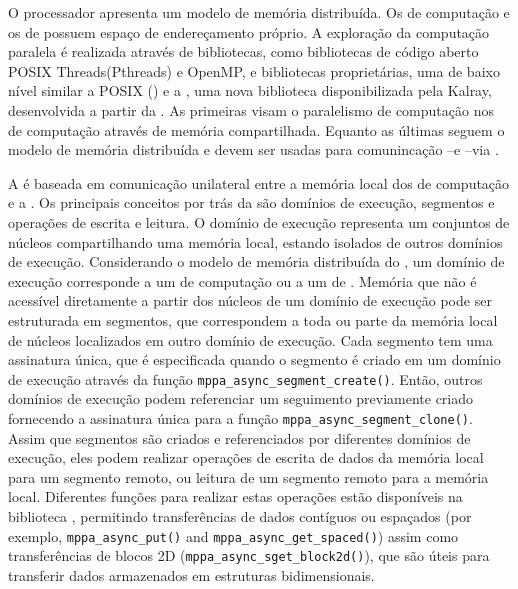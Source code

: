 O processador apresenta um modelo de memória distribuída. Os \clusters de computação e os \clusters de \io possuem espaço de endereçamento próprio. A exploração da computação paralela 
é realizada através de bibliotecas, como bibliotecas de código aberto POSIX Threads(Pthreads) e OpenMP, e bibliotecas proprietárias, uma de baixo nível similar a POSIX (\ipc) e a \async, uma nova biblioteca disponibilizada pela Kalray, desenvolvida a partir da \ipc. As primeiras visam o paralelismo de computação nos \clusters de computação através de memória compartilhada. Equanto as últimas seguem o modelo de memória distribuída e devem ser usadas para comunincação \cluster--\cluster e \cluster--\io via \noc.

A \async é baseada em comunicação unilateral entre a memória local dos \clusters de computação e a \lpddr. Os principais conceitos por trás da \async são domínios de execução, segmentos e operações de escrita e leitura. O domínio de execução representa um conjuntos de núcleos compartilhando uma memória local, estando isolados de outros domínios de execução. Considerando o modelo de memória distribuída do \mppa, um domínio de execução corresponde a um \cluster de computação ou a um \cluster de \io. Memória que não é acessível diretamente a partir dos núcleos de um domínio de execução pode ser estruturada em segmentos, que correspondem a toda ou parte da memória local de núcleos localizados em outro domínio de execução. Cada segmento tem uma assinatura única, que é especificada quando o segmento é criado em um domínio de execução através da função \texttt{mppa\_async\_segment\_create()}. Então, outros domínios de execução podem referenciar um seguimento previamente criado fornecendo a assinatura única para a função \texttt{mppa\_async\_segment\_clone()}. Assim que segmentos são criados e referenciados por diferentes domínios de execução,  eles podem realizar operações de escrita de dados da memória local para um segmento remoto, ou leitura de um segmento remoto para a memória local.
Diferentes funções para realizar estas operações estão disponíveis na biblioteca \async, permitindo transferências de dados contíguos ou espaçados (por exemplo, \texttt{mppa\_async\_put()} and \texttt{mppa\_async\_get\_spaced()}) assim como transferências de blocos 2D (\texttt{mppa\_async\_sget\_block2d()}), que são úteis para transferir dados armazenados em estruturas bidimensionais.

